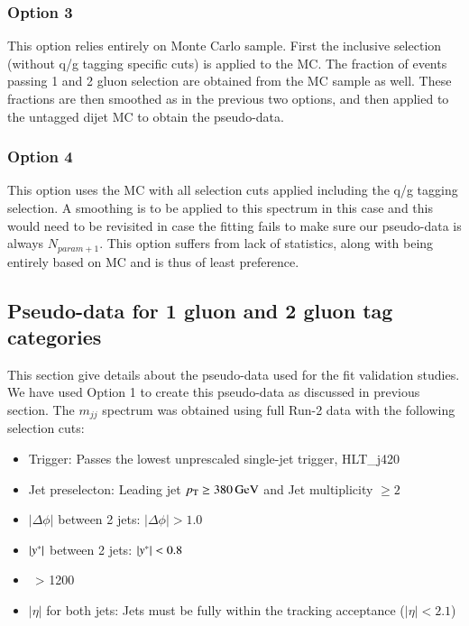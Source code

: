 \subsubsection{Option 3}
This option relies entirely on Monte Carlo sample. First the inclusive selection (without q/g tagging specific cuts)
is applied to the MC. The fraction of events passing 1 and 2 gluon selection are obtained from the MC sample as well. These
fractions are then smoothed as in the previous two options, and then applied to the untagged dijet MC to obtain the pseudo-data.

\subsubsection{Option 4}
This option uses the MC with all selection cuts applied including the q/g tagging selection. 
A smoothing is to be applied to this spectrum in this case and this would need to be revisited 
in case the fitting fails to make sure our pseudo-data is always $N_{param+1}$.
This option suffers from lack of statistics, along with being entirely based on MC and is thus of least preference. 

\subsection{Pseudo-data for 1 gluon and 2 gluon tag categories}
This section give details about the pseudo-data used for the fit validation studies.
We have used Option 1 to create this pseudo-data as discussed in previous section. The $m_{jj}$ spectrum was
obtained using full Run-2 data with the following selection cuts:

\begin{itemize}
\item Trigger: Passes the lowest unprescaled single-jet trigger, HLT\_j420
\item Jet preselecton: Leading jet $\pt\ge 380\,\GeV$ and Jet multiplicity $\ge 2$
\item $|\Delta\phi|$ between 2 jets: $|\Delta\phi| > 1.0$
\item $|y^\ast|$ between 2 jets: $|y^\ast|<0.8$
\item \mjj\: \mjj\ > 1200\,\GeV 
\item $|\eta|$ for both jets: Jets must be fully within the tracking acceptance ($|\eta|<2.1$)
\end{itemize}

